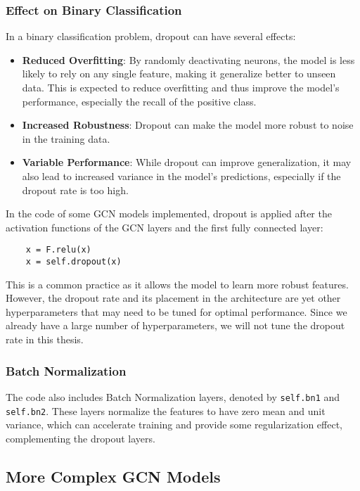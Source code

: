 \subsubsection{Effect on Binary Classification}

In a binary classification problem, dropout can have several effects:

\begin{itemize}
    \item \textbf{Reduced Overfitting}: By randomly deactivating neurons, the model is less likely to rely on any single feature, making it generalize better to unseen data. This is expected to reduce overfitting and thus improve the model's performance, especially the recall of the positive class.
    \item \textbf{Increased Robustness}: Dropout can make the model more robust to noise in the training data.
    \item \textbf{Variable Performance}: While dropout can improve generalization, it may also lead to increased variance in the model's predictions, especially if the dropout rate is too high.
\end{itemize}

In the code of some GCN models implemented, dropout is applied after the activation functions of the GCN layers and the first fully connected layer:

\begin{verbatim}
    x = F.relu(x)
    x = self.dropout(x)
\end{verbatim}

This is a common practice as it allows the model to learn more robust features. However, the dropout rate and its placement in the architecture are yet other hyperparameters that may need to be tuned for optimal performance. Since we already have a large number of hyperparameters, we will not tune the dropout rate in this thesis.

\subsubsection{Batch Normalization}

The code also includes Batch Normalization layers, denoted by \texttt{self.bn1} and \texttt{self.bn2}. These layers normalize the features to have zero mean and unit variance, which can accelerate training and provide some regularization effect, complementing the dropout layers.

\subsection{More Complex GCN Models}

